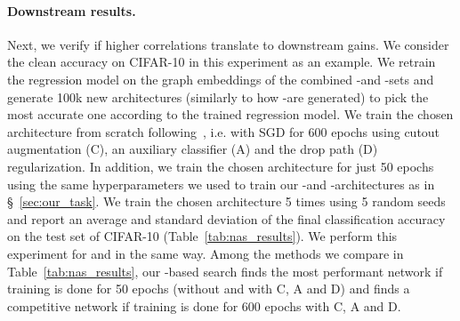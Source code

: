\paragraph{Downstream results.} Next, we verify if higher correlations translate to downstream gains. We consider the clean accuracy on CIFAR-10 in this experiment as an example. We retrain the regression model on the graph embeddings of the combined \iid-\iidval and \iid-\iidtest sets and generate 100k new architectures (similarly to how \iid-\iidtest are generated) to pick the most accurate one according to the trained regression model. We train the chosen architecture from scratch following~\cite{liu2018darts,zhang2018graph,chen2019progressive}, i.e. with SGD for 600 epochs using cutout augmentation (C), an auxiliary classifier (A) and the drop path (D) regularization. In addition, we train the chosen architecture for just 50 epochs using the same hyperparameters we used to train our \iid-\iidval and \iid-\iidtest architectures as in \S~\ref{sec:our_task}. We train the chosen architecture 5 times using 5 random seeds and report an average and standard deviation of the final classification accuracy on the test set of CIFAR-10 (Table~\ref{tab:nas_results}). We perform this experiment for \ghnbase and \ghnours in the same way.
Among the methods we compare in Table~\ref{tab:nas_results}, our \ghnours-based search finds the most performant network if training is done for 50 epochs (without and with C, A and D) and finds a competitive network if training is done for 600 epochs with C, A and D.

